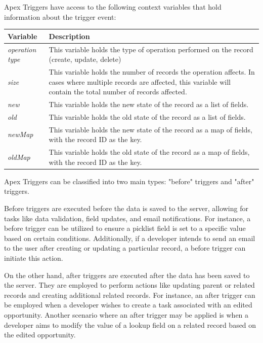\documentclass[12pt]{article}
\begin{document}
Apex Triggers have access to the following context variables that hold information about the trigger event:
\begin{table}[ht]
    \begin{tabular}{|l|p{13cm}|}
        \hline
        \textbf{Variable} & \textbf{Description} \\ \hline
        \textit{operation type} & This variable holds the type of operation performed on the record (create, update, delete) \\ \hline
        \textit{size} & This variable holds the number of records the operation affects. In cases where multiple records are affected, this variable will contain the total number of records affected. \\ \hline
        \textit{new} & This variable holds the new state of the record as a list of fields. \\ \hline
        \textit{old} & This variable holds the old state of the record as a list of fields. \\ \hline
        \textit{newMap} & This variable holds the new state of the record as a map of fields, with the record ID as the key. \\ \hline
        \textit{oldMap} & This variable holds the old state of the record as a map of fields, with the record ID as the key. \\ \hline
    \end{tabular}
\end{table}

Apex Triggers can be classified into two main types: "before" triggers and "after" triggers.

Before triggers are executed before the data is saved to the server, allowing for tasks like data validation, field updates, and email notifications. For instance, a before trigger can be utilized to ensure a picklist field is set to a specific value based on certain conditions. Additionally, if a developer intends to send an email to the user after creating or updating a particular record, a before trigger can initiate this action.

On the other hand, after triggers are executed after the data has been saved to the server. They are employed to perform actions like updating parent or related records and creating additional related records. For instance, an after trigger can be employed when a developer wishes to create a task associated with an edited opportunity. Another scenario where an after trigger may be applied is when a developer aims to modify the value of a lookup field on a related record based on the edited opportunity.
\end{document}
